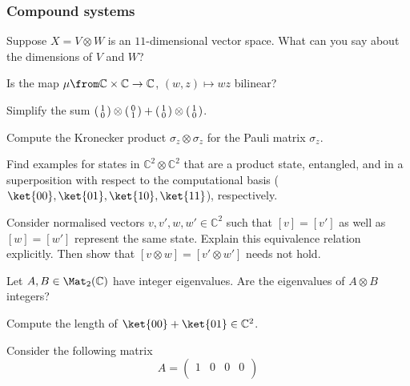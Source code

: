 \documentclass[a4paper,oneside, 12pt]{amsart}
\begin{document}
\subsubsection*{Compound systems}
\begin{thmlist}
  \item Suppose \(X= V\otimes W\) is an \(11\)-dimensional vector space. What can you say about the dimensions of \(V\) and \(W\)?
  \item Is the map \(\mu \from \mathbb{C} \times \mathbb{C} \to \mathbb{C}\), \((w,z) \mapsto wz\) bilinear?
  \item Simplify the sum \(
  \begin{psmallmatrix}
    1 \\ 0
  \end{psmallmatrix} \otimes
  \begin{psmallmatrix}
     0 \\ 1
  \end{psmallmatrix}
  +
  \begin{psmallmatrix}
    1 \\ 0
  \end{psmallmatrix} \otimes
  \begin{psmallmatrix}
    1 \\ 0
  \end{psmallmatrix}
\).
  \item Compute the Kronecker product \(\sigma_{z}\otimes \sigma_{z}\) for the Pauli matrix \(\sigma_{z}\).
  \item Find examples for states in \( \mathbb{C}^{2}\otimes \mathbb{C}^{2}\) that are  a product state, entangled, and in a superposition with respect to the computational basis (\(\ket{00},\ket{01}, \ket{10}, \ket{11}\)), respectively.
  \item Consider normalised vectors \(v, v', w, w' \in \mathbb{C}^{2}\) such that \([v]=[v']\) as well as  \([w]=[w']\) represent the same state.
  Explain this equivalence relation explicitly.
  Then show that \([v\otimes w] = [v' \otimes w']\) needs not hold.
  \item Let \(A , B \in \Mat_{2}( \mathbb{C})\) have integer eigenvalues.
  Are the eigenvalues of \(A\otimes B\) integers?
  \item Compute the length of \(\ket{00} + \ket{01} \in \mathbb{C}^{2}\).
  \item Consider the following matrix
  \begin{equation*}
      A=\begin{pmatrix}
    1 & 0 & 0 & 0 \\

\end{pmatrix}
\end{equation*}
\end{thmlist}
\end{document}
